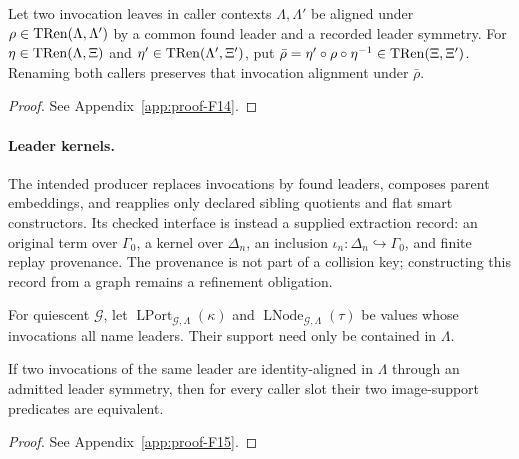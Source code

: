 \begin{lemma}
\label{lem:graph-rel-transport}
Let two invocation leaves in caller contexts $\Lambda,\Lambda'$ be aligned
under $\rho\in\operatorname{TRen}(\Lambda,\Lambda')$ by a common found leader and a
recorded leader symmetry.  For
$\eta\in\operatorname{TRen}(\Lambda,\Xi)$ and
$\eta'\in\operatorname{TRen}(\Lambda',\Xi')$, put
$\bar\rho=\eta'\circ\rho\circ\eta^{-1}\in\operatorname{TRen}(\Xi,\Xi')$.
Renaming both callers preserves that invocation alignment under $\bar\rho$.
\end{lemma}
\begin{proof}See Appendix~\ref{app:proof-F14}.\end{proof}

\paragraph{Leader kernels.}
The intended producer replaces invocations by found leaders, composes parent
embeddings, and reapplies only declared sibling quotients and flat smart
constructors.  Its checked interface is instead a supplied extraction record:
an original term over $\Gamma_0$, a kernel over $\Delta_n$, an inclusion
$\iota_n:\Delta_n\hookrightarrow\Gamma_0$, and finite replay provenance.
The provenance is not part of a collision key; constructing this record from
a graph remains a refinement obligation.

For quiescent $\mathcal G$, let
$\operatorname{LPort}_{\mathcal G,\Lambda}(\kappa)$ and
$\operatorname{LNode}_{\mathcal G,\Lambda}(\tau)$ be values whose invocations
all name leaders.  Their support need only be contained in $\Lambda$.

\begin{lemma}
\label{lem:leader-id-support}
If two invocations of the same leader are identity-aligned in $\Lambda$
through an admitted leader symmetry, then for every caller slot their two
image-support predicates are equivalent.
\end{lemma}
\begin{proof}See Appendix~\ref{app:proof-F15}.\end{proof}

